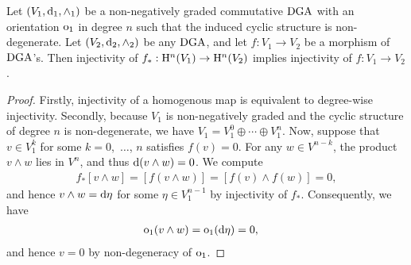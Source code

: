 \documentclass[\MainFolder/Text.tex]{subfiles}
\begin{document}
\begin{Lemma}\label{Lem:AutomaticInjectivity}
Let $(V_1,\mathrm{d}_1,\wedge_1)$ be a non-negatively graded commutative $\mathrm{DGA}$ with an orientation $\mathrm{o}_1$ in degree $n$ such that the induced cyclic structure is non-degenerate. Let $(V_2,\mathrm{d}_2,\wedge_2)$ be any $\mathrm{DGA}$, and let $f: V_1 \rightarrow V_2$ be a morphism of $\mathrm{DGA}$'s. Then injectivity of $f_*: \mathrm{H}^n(V_1) \rightarrow \mathrm{H}^n(V_2)$ implies injectivity of $f: V_1 \rightarrow V_2$.
\end{Lemma}
\begin{proof}
Firstly, injectivity of a homogenous map is equivalent to degree-wise injectivity. Secondly, because $V_1$ is non-negatively graded and the cyclic structure of degree $n$ is non-degenerate, we have $V_1 = V_1^0\oplus\dotsb\oplus V_1^n$. Now, suppose that $v\in V_1^k$ for some $k=0$,~$\dotsc$, $n$ satisfies $f(v) = 0$. For any $w\in V^{n-k}$, the product $v\wedge w$ lies in $V^n$, and thus $\mathrm{d}(v\wedge w)=0$. We compute
\begin{align*}
f_* [v\wedge w] = [f(v\wedge w)] = [f(v)\wedge f(w)] = 0,
\end{align*}
and hence $v\wedge w = \mathrm{d} \eta$ for some $\eta \in V_1^{n-1}$ by injectivity of $f_*$. Consequently, we have
\begin{align*}
\mathrm{o}_1(v\wedge w) &= \mathrm{o}_1(\mathrm{d} \eta) =0,
\end{align*}
and hence $v = 0$ by non-degeneracy of $\mathrm{o}_1$.
\end{proof}
\end{document}
